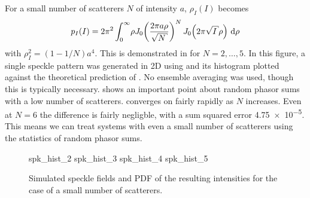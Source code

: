 For a small number of scatterers $N$ of intensity $a$, $\rho_I(I)$ becomes
\begin{equation}
p_I(I) = 2\pi^2 \int_0^\infty\! \rho J_0\!\left(\frac{2\pi a
\rho}{\sqrt{N}}\right)^N J_0\!\left(2\pi\sqrt{I}\rho\right)\md\rho
\label{eqn:smallscatteqn}
\end{equation}
with $\rho_I^2=(1-1/N)a^4$.  This is demonstrated in  for
$N=2,\ldots,5$.  In this figure, a single speckle pattern was generated in 2D
using  and its histogram plotted against the
theoretical prediction of .  No ensemble
averaging was used, though this is typically necessary.
 shows an important point about random phasor sums
with a low number of scatterers.   converges on
 fairly rapidly as $N$ increases.  Even at $N=6$ the
difference is fairly negligble, with a sum squared error \num{4.75e-5}.
This means we can treat systems with even a small number of scatterers
using the statistics of random phasor sums.
\begin{figure}[ht]
\centering
{spk_hist_2}
{spk_hist_3}
{spk_hist_4}
{spk_hist_5}
\caption{Simulated speckle fields and PDF of the resulting intensities for
the case of a small number of scatterers.}
\label{fig:lowscatthist}
\end{figure}
